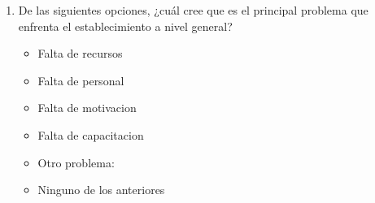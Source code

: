 \documentclass{article}
\begin{document}
\begin{enumerate}[leftmargin=*, label=\arabic*.]
        \item De las siguientes opciones, ¿cuál cree que es el principal problema que enfrenta el establecimiento a nivel general?
        \begin{itemize}[label=$\square$]
            \item Falta de recursos
            \item Falta de personal
            \item Falta de motivacion
            \item Falta de capacitacion
            \item Otro problema: \underline{\hspace{0.5\linewidth}}
            \item Ninguno de los anteriores
        \end{itemize}
\end{enumerate}
\end{document}
